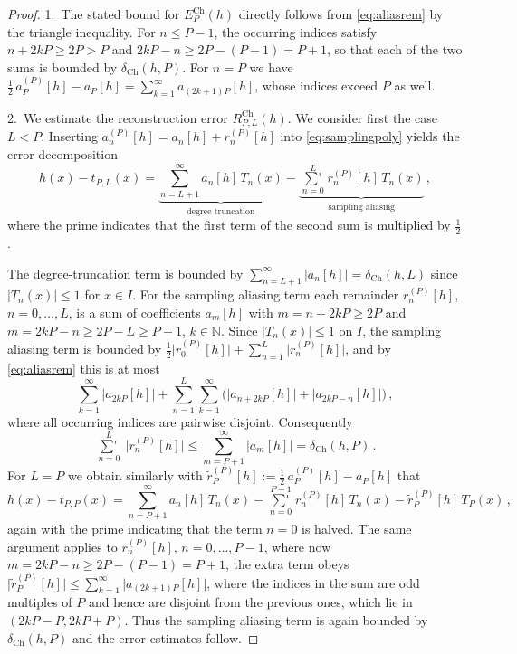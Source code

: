 \documentclass[11pt,a4paper]{scrartcl}
\newcommand{\sumprime}{\mathop{{\sum}'}\limits}
\numberwithin{equation}{section}
\numberwithin{table}{section}
\numberwithin{figure}{section}
\newcommand{\N}{\mathbb N}
\newcommand{\dch}{\delta_{\mathrm{Ch}}}
\newcommand{\Ech}{E^{\mathrm{Ch}}}
\newcommand{\Rch}{R^{\mathrm{Ch}}}
\begin{document}
\begin{proof}
1.\ The stated bound for  $\Ech_{P}(h)$ directly follows from
\eqref{eq:aliasrem} by the triangle inequality. For $n \leq P-1$, the occurring
indices satisfy $n+2kP \geq 2P > P$ and $2kP-n \geq 2P - (P-1) = P+1$, so that
each of the two sums is bounded by $\dch(h,P)$. For $n=P$ we have
$\tfrac12\,a_P^{(P)}[h] - a_P[h] = \sum_{k=1}^{\infty} a_{(2k+1)P}[h]$, whose
indices exceed $P$ as well.

2.\ We estimate the reconstruction error $\Rch_{P,L}(h)$. We consider first the case $L<P$.
Inserting $a_n^{(P)}[h] =
a_n[h] + r_n^{(P)}[h]$ into \eqref{eq:samplingpoly} yields
the
error decomposition
\begin{equation}
	\label{eq:errordecomp}
	 \textstyle h(x) - t_{P,L}(x) = \underbrace{ \textstyle \sum\limits_{n=L+1}^{\infty}a_n[h]\,T_n(x)}_{\text{degree truncation}}
	- \underbrace{ \textstyle \sumprime_{n=0}^L r_n^{(P)}[h]\,T_n(x)}_{\text{sampling aliasing}}\,,
\end{equation}
where the prime indicates that the first term of the second sum is multiplied by $\tfrac12$.

The degree-truncation term is bounded by
$\sum_{n=L+1}^\infty|a_n[h]| = \dch(h,L)$  since $|T_n(x)| \le 1$ for $x \in I$. For the sampling aliasing term
each remainder $r_n^{(P)}[h]$, $n =0,\ldots,L$, is a sum of coefficients $a_m[h]$
with $m=n+2kP\geq 2P$ and $m=2kP-n \geq 2P-L\geq P+1$, $k\in\N$.
Since $|T_n(x)|\le 1$ on $I$, the sampling aliasing term is bounded by
$\frac12\big|r_0^{(P)}[h]\big| + \sum_{n=1}^{L}\big|r_n^{(P)}[h]\big|$, and by \eqref{eq:aliasrem}
this is at most
$$
\textstyle \sum\limits_{k=1}^{\infty}\big|a_{2kP}[h]\big|
+ \sum\limits_{n=1}^{L}\sum\limits_{k=1}^{\infty}\Big(\big|a_{n+2kP}[h]\big| + \big|a_{2kP-n}[h]\big|\Big)\,,
$$
 where all occurring indices are pairwise disjoint.
Consequently
$$
\textstyle \sumprime_{n=0}^L \,\big|r_n^{(P)}[h]\big| \leq \sum\limits_{m=P+1}^\infty|a_m[h]| = \dch(h,P)\,.
$$
For $L=P$  we obtain similarly with $
\textstyle \tilde{r}_P^{(P)}[h] := \tfrac12\,a_P^{(P)}[h] - a_P[h] $
that
\begin{equation}
	\label{eq:errordecompP}
\textstyle 	h(x) - t_{P,P}(x) = \sum\limits_{n=P+1}^{\infty}a_n[h]\,T_n(x)
	- \sumprime_{n=0}^{P-1} r_n^{(P)}[h]\,T_n(x)
	- \tilde{r}_P^{(P)}[h]\,T_P(x)\,,
\end{equation}
again with the prime indicating that the term $n=0$ is halved.
The same argument applies to $r_n^{(P)}[h]$, $n =0,\ldots,P-1$, where
now $m=2kP-n\geq 2P-(P-1)=P+1$, the extra term obeys
$\big|\tilde{r}_P^{(P)}[h]\big|\leq\sum_{k=1}^{\infty}\big|a_{(2k+1)P}[h]\big|$,
where the indices  in the sum are odd multiples of $P$ and hence are disjoint from the
previous ones, which
lie in $(2kP-P,2kP+P)$. Thus the
sampling aliasing term is again bounded by $\dch(h,P)$  and the error estimates follow.
\end{proof}
\end{document}
